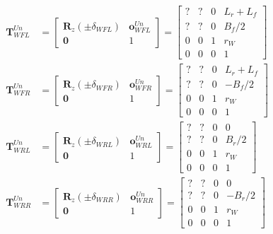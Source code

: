 \begin{align}
  \mathbf{T}_{WFL}^{Un} &= 
  \begin{bmatrix}
    \mathbf{R}_z(\pm \delta_{WFL}) & \mathbf{o}_{WFL}^{Un} \\
    \mathbf{0} & 1
  \end{bmatrix}
  =
  \begin{bmatrix}
    ? & ? & 0 & L_r + L_f \\
    ? & ? & 0 & B_f/2 \\
    0 & 0 & 1 & r_W \\
    0 & 0 & 0 & 1
  \end{bmatrix} \\
  \mathbf{T}_{WFR}^{Un} &= 
  \begin{bmatrix}
    \mathbf{R}_z(\pm \delta_{WFR}) & \mathbf{o}_{WFR}^{Un} \\
    \mathbf{0} & 1
  \end{bmatrix}
  =
  \begin{bmatrix}
    ? & ? & 0 & L_r + L_f \\
    ? & ? & 0 & -B_f/2 \\
    0 & 0 & 1 & r_W \\
    0 & 0 & 0 & 1
  \end{bmatrix} \\
  \mathbf{T}_{WRL}^{Un} &= 
  \begin{bmatrix}
    \mathbf{R}_z(\pm \delta_{WRL}) & \mathbf{o}_{WRL}^{Un} \\
    \mathbf{0} & 1
  \end{bmatrix}
  =
  \begin{bmatrix}
    ? & ? & 0 & 0 \\
    ? & ? & 0 & B_r/2 \\
    0 & 0 & 1 & r_W \\
    0 & 0 & 0 & 1
  \end{bmatrix} \\
  \mathbf{T}_{WRR}^{Un} &= 
  \begin{bmatrix}
    \mathbf{R}_z(\pm \delta_{WRR}) & \mathbf{o}_{WRR}^{Un} \\
    \mathbf{0} & 1
  \end{bmatrix}
  =
  \begin{bmatrix}
    ? & ? & 0 & 0 \\
    ? & ? & 0 & -B_r/2 \\
    0 & 0 & 1 & r_W \\
    0 & 0 & 0 & 1
  \end{bmatrix} \\
\end{align}









